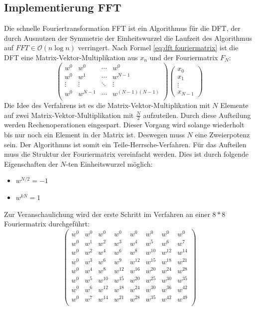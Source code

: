 \subsection{Implementierung FFT}
Die schnelle Fouriertransformation FFT ist ein Algorithmus für die DFT, der durch Ausnutzen der Symmetrie der Einheitswurzel die Laufzeit des Algorithmus auf $FFT \in \mathcal O(n \log n)$ verringert.
\newline
Nach Formel \ref{eq:dft fouriermatrix} ist die DFT eine Matrix-Vektor-Multiplikation aus $x_{n}$ und der Fouriermatrix $F_{N}$:
\begin{equation}
\left( \begin{array}{cccc}
w^0 & w^0 & \cdots & w^0\\
w^0 & w^1 & \cdots & w^{N-1}\\
\vdots & \vdots & \ddots & \vdots\\
w^0 & w^{N-1} & \cdots & w^{(N-1)(N-1)}\\
\end{array}\right)
\left( \begin{array}{c}
x_0\\
x_1\\
\vdots\\
x_{N-1}
\end{array}\right)
\end{equation}
Die Idee des Verfahrens ist es die Matrix-Vektor-Multiplikation mit $N$ Elemente auf zwei Matrix-Vektor-Multiplikation mit $\frac{N}{2}$ aufzuteilen. Durch diese Aufteilung werden Rechenoperationen eingespart. Dieser Vorgang wird solange wiederholt bis nur noch ein Element in der Matrix ist. Deswegen muss $N$ eine Zweierpotenz sein. Der Algorithmus ist somit ein Teile-Herrsche-Verfahren.
Für das Aufteilen muss die Struktur der Fouriermatrix vereinfacht werden. Dies ist durch folgende Eigenschaften der $N$-ten Einheitswurzel möglich:
\begin{itemize}
\item $w^{N/2} = -1$ 
\item $w^{kN} = 1$
\end{itemize}
Zur Veranschaulichung wird der erste Schritt im Verfahren an einer $8*8$ Fouriermatrix durchgeführt:
\begin{equation*}
\left( \begin{array}{cccccccc}
w^{0} & w^{0} & w^{0} & w^{0} & w^{0} & w^{0} & w^{0} & w^{0}\\
w^{0} & w^{1} & w^{2} & w^{3} & w^{4} & w^{5} & w^{6} & w^{7}\\
w^{0} & w^{2} & w^{4} & w^{6} & w^{8} & w^{10} & w^{12} & w^{14}\\
w^{0} & w^{3} & w^{6} & w^{9} & w^{12} & w^{15} & w^{18} & w^{21}\\
w^{0} & w^{4} & w^{8} & w^{12} & w^{16} & w^{20} & w^{24} & w^{28}\\
w^{0} & w^{5} & w^{10} & w^{15} & w^{20} & w^{25} & w^{30} & w^{35}\\
w^{0} & w^{6} & w^{12} & w^{18} & w^{24} & w^{30} & w^{36} & w^{42}\\
w^{0} & w^{7} & w^{14} & w^{21} & w^{28} & w^{35} & w^{42} & w^{49}\\
\end{array} \right)
\end{equation*}
